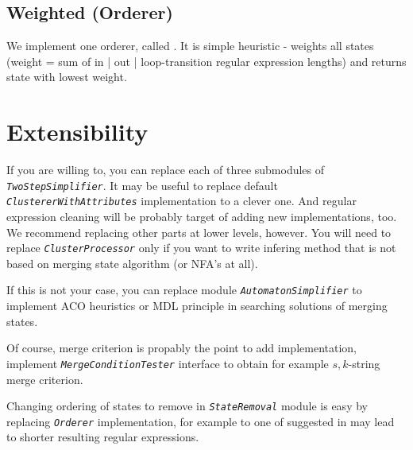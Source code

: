 \documentclass[a4paper,10pt,oneside]{article}
\newcommand{\code}[1]{\texttt{\StrSubstitute{#1}{.}{.\.}}}
\def\.{\discretionary{}{}{}}
\newcommand{\jmodule}[1]{\texttt{\textit{#1}}}
\begin{document}
\subsection{Weighted (Orderer)} \label{section_Weighted}
We implement one orderer, called \code{Weighted}.
It is simple heuristic - weights all states (weight = sum of {in | out | loop}-transition regular expression lengths) and returns state with lowest weight.

\section{Extensibility}
If you are willing to, you can replace each of three submodules of \jmodule{TwoStepSimplifier}.
It may be useful to replace default \jmodule{ClustererWithAttributes} implementation to a clever one.
And regular expression cleaning will be probably target of adding new implementations, too.
We recommend replacing other parts at lower levels, however.
You will need to replace \jmodule{ClusterProcessor} only if you want to write infering method that is not based on merging state algorithm (or NFA's at all).

If this is not your case, you can replace module \jmodule{AutomatonSimplifier} to implement ACO heuristics or MDL principle in searching solutions of merging states.

Of course, merge criterion is propably the point to add implementation, implement \jmodule{MergeConditionTester} interface to obtain for example $s,k$-string merge criterion.

Changing ordering of states to remove in \jmodule{StateRemoval} module is easy by replacing \jmodule{Orderer} implementation, for example to one of suggested in \cite{1224321} may lead to shorter resulting regular expressions.
\end{document}
